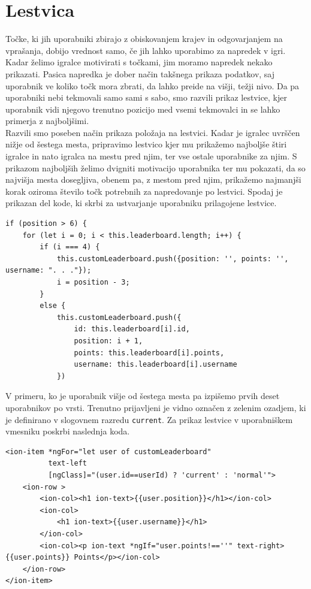 \documentclass[a4paper, 12pt]{book}
\begin{document}
\section{Lestvica}
Točke, ki jih uporabniki zbirajo z obiskovanjem krajev in odgovarjanjem na vprašanja, dobijo vrednost samo, če jih lahko uporabimo za napredek v igri. Kadar želimo igralce motivirati s točkami, jim moramo napredek nekako prikazati. Pasica napredka je dober način takšnega prikaza podatkov, saj uporabnik ve koliko točk mora zbrati, da lahko preide na višji, težji nivo. Da pa uporabniki nebi tekmovali samo sami s sabo, smo razvili prikaz lestvice, kjer uporabnik vidi njegovo trenutno pozicijo med vsemi tekmovalci in se lahko primerja z najboljšimi.\\Razvili smo poseben način prikaza položaja na lestvici. Kadar je igralec uvrščen nižje od šestega mesta, pripravimo lestvico kjer mu prikažemo najboljše štiri igralce in nato igralca na mestu pred njim, ter vse ostale uporabnike za njim. S prikazom najboljših želimo dvigniti motivacijo uporabnika ter mu pokazati, da so najvišja mesta dosegljiva, obenem pa, z mestom pred njim, prikažemo najmanjši korak oziroma število točk potrebnih za napredovanje po lestvici. Spodaj je prikazan del kode, ki skrbi za ustvarjanje uporabniku prilagojene lestvice.
\begin{lstlisting}
if (position > 6) {
    for (let i = 0; i < this.leaderboard.length; i++) {
        if (i === 4) {
            this.customLeaderboard.push({position: '', points: '', username: ". . ."});
            i = position - 3;
        }
        else {
            this.customLeaderboard.push({
                id: this.leaderboard[i].id,
                position: i + 1,
                points: this.leaderboard[i].points,
                username: this.leaderboard[i].username
            })
\end{lstlisting}
\noindent V primeru, ko je uporabnik višje od šestega mesta pa izpišemo prvih deset uporabnikov po vrsti. Trenutno prijavljeni je vidno označen z zelenim ozadjem, ki je definirano v slogovnem razredu \texttt{current}. Za prikaz lestvice v uporabniškem vmesniku poskrbi naslednja koda.
\begin{lstlisting}
<ion-item *ngFor="let user of customLeaderboard"
          text-left
          [ngClass]="(user.id==userId) ? 'current' : 'normal'">
    <ion-row >
        <ion-col><h1 ion-text>{{user.position}}</h1></ion-col>
        <ion-col>
            <h1 ion-text>{{user.username}}</h1>
        </ion-col>
        <ion-col><p ion-text *ngIf="user.points!==''" text-right>{{user.points}} Points</p></ion-col>
    </ion-row>
</ion-item>
\end{lstlisting}
\end{document}
